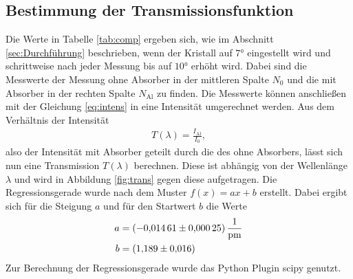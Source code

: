 
\FloatBarrier

\subsection{Bestimmung der Transmissionsfunktion}
Die Werte in Tabelle \ref{tab:comp} ergeben sich, wie im Abschnitt \ref{sec:Durchführung} beschrieben, wenn der Kristall auf $7\si{\degree}$ eingestellt wird und schrittweise nach jeder Messung bis auf $10\si{\degree}$ erhöht wird.
Dabei sind die Messwerte der Messung ohne Absorber in der mittleren Spalte $N_0$ und die mit Absorber in der rechten Spalte $N_\text{Al}$ zu finden.
Die Messwerte können anschließen mit der Gleichung \eqref{eq:intens} in eine Intensität umgerechnet werden.
Aus dem Verhältnis der Intensität
\begin{align*} 
T(\lambda) = \frac{I_\text{Al}}{I_0},
\end{align*}
also der Intensität mit Absorber geteilt durch die des ohne Absorbers, lässt sich nun eine Transmission $T(\lambda)$ berechnen.
Diese ist abhängig von der Wellenlänge $\lambda$ und wird in Abbildung \ref{fig:trans} gegen diese aufgetragen.
Die Regressionsgerade wurde nach dem Muster $f(x) = ax+b$ erstellt.
Dabei ergibt sich für die Steigung $a$ und für den Startwert $b$ die Werte
\begin{align*}
  a & =  \SI{-0.01461(25)}{\frac{1}{\pico\meter}} \\
  b & =   \SI{1.189(16)}{} \\
\end{align*}
Zur Berechnung der Regressionsgerade wurde das Python Plugin scipy \cite{scipy} genutzt.
